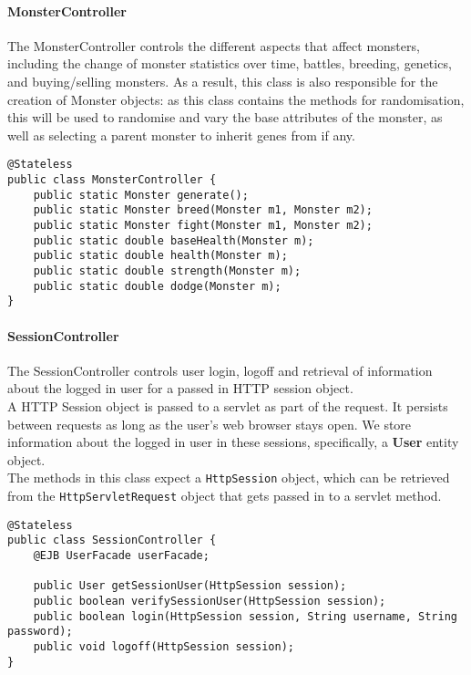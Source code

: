 \paragraph{MonsterController} The MonsterController controls the different aspects that affect monsters, including the change of monster statistics over time, battles, breeding, genetics, and buying/selling monsters.
As a result, this class is also responsible for the creation of Monster objects: as this class contains the methods for randomisation, this will be used to randomise and vary the base attributes of the monster, as well as selecting a parent monster to inherit genes from if any.
\begin{small}\begin{verbatim}
@Stateless
public class MonsterController {
    public static Monster generate();
    public static Monster breed(Monster m1, Monster m2);
    public static Monster fight(Monster m1, Monster m2);
    public static double baseHealth(Monster m);
    public static double health(Monster m);
    public static double strength(Monster m);
    public static double dodge(Monster m);
}
\end{verbatim}\end{small}
\paragraph{SessionController}
The SessionController controls user login, logoff and retrieval of information about the logged in user for a passed in HTTP session object.
\\A HTTP Session object is passed to a servlet as part of the request. It persists between requests as long as the user's web browser stays open. We store information about the logged in user in these sessions, specifically, a \textbf{User} entity object.
\\The methods in this class expect a \texttt{HttpSession} object, which can be retrieved from the \texttt{HttpServletRequest} object that gets passed in to a servlet method.
\begin{small}\begin{verbatim}
@Stateless
public class SessionController {
    @EJB UserFacade userFacade;
    
    public User getSessionUser(HttpSession session);
    public boolean verifySessionUser(HttpSession session);
    public boolean login(HttpSession session, String username, String password);
    public void logoff(HttpSession session);
}
\end{verbatim}\end{small}


